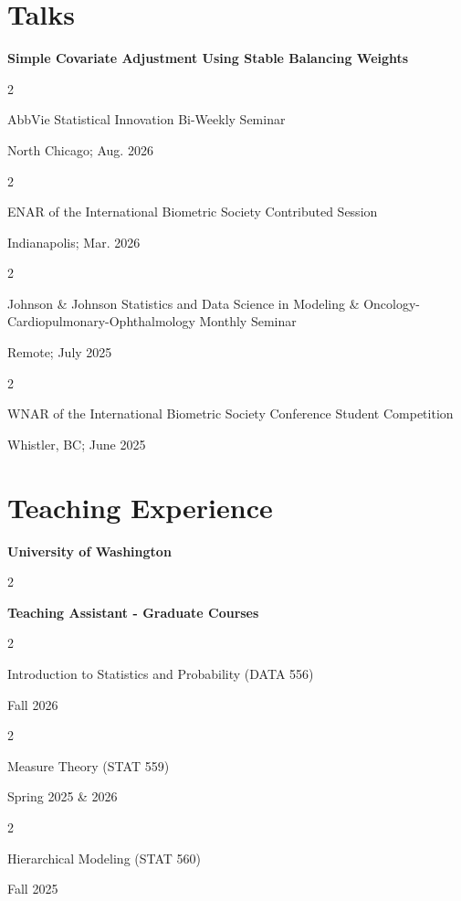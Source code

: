 \documentclass[10pt, letterpaper]{article}
\newenvironment{twocolentry}[2][]{
    \onecolentry
    \def\secondColumn{#2}
    \setcolumnwidth{\fill, 4.5 cm}
    \begin{paracol}{2}
}{
    \switchcolumn \raggedleft \secondColumn
    \end{paracol}
    \endonecolentry
}
\begin{document}
\section{Talks}






\textbf{Simple Covariate Adjustment Using Stable Balancing Weights}

\vspace{3 mm}

\begin{twocolentry}{North Chicago; Aug. 2026}
    AbbVie Statistical Innovation Bi-Weekly Seminar
\end{twocolentry}

\begin{twocolentry}{Indianapolis; Mar. 2026}
    ENAR of the International Biometric Society Contributed Session
\end{twocolentry}

\begin{twocolentry}{Remote; July 2025}
    Johnson \& Johnson Statistics and Data Science in Modeling \& Oncology-\\Cardiopulmonary-Ophthalmology Monthly Seminar
\end{twocolentry}


\begin{twocolentry}{Whistler, BC; June 2025}
    WNAR of the International Biometric Society Conference Student Competition
\end{twocolentry}

\section{Teaching Experience}

\textbf{University of Washington}

\vspace{3 mm}

\begin{twocolentry}{}
    \textbf{Teaching Assistant - Graduate Courses}
\end{twocolentry}
\begin{twocolentry}{Fall 2026}
    \hspace{3 mm} Introduction to Statistics and Probability (DATA 556)
\end{twocolentry}
\begin{twocolentry}{Spring 2025 \& 2026}
    \hspace{3 mm} Measure Theory (STAT 559)
\end{twocolentry}
\begin{twocolentry}{Fall 2025}
    \hspace{3 mm} Hierarchical Modeling (STAT 560)
\end{twocolentry}
\end{document}
